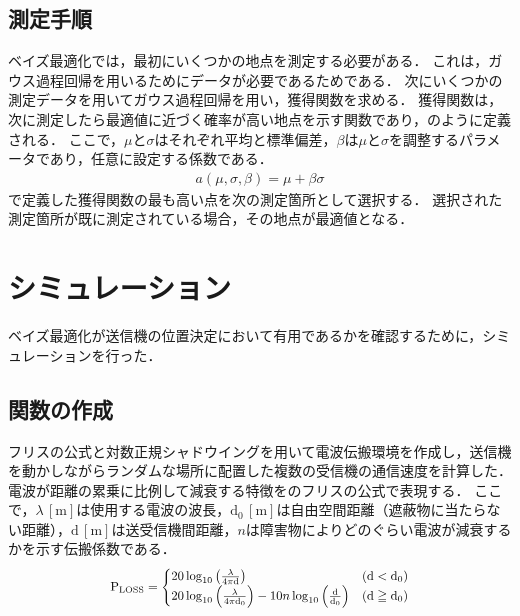 \documentclass[twocolumn]{ltjarticle}
\begin{document}
\subsection{測定手順}

ベイズ最適化では，最初にいくつかの地点を測定する必要がある．
これは，ガウス過程回帰を用いるためにデータが必要であるためである．
次にいくつかの測定データを用いてガウス過程回帰を用い，獲得関数を求める．
獲得関数は，次に測定したら最適値に近づく確率が高い地点を示す関数であり，のように定義される．
ここで，\(\mu\)と\(\sigma\)はそれぞれ平均と標準偏差，\(\beta\)は\(\mu\)と\(\sigma\)を調整するパラメータであり，任意に設定する係数である．
\begin{align}
	a(\mu, \sigma, \beta) = \mu + \beta \sigma \label{eq:acquisition}
\end{align}
で定義した獲得関数の最も高い点を次の測定箇所として選択する．
選択された測定箇所が既に測定されている場合，その地点が最適値となる．
\section{シミュレーション}

ベイズ最適化が送信機の位置決定において有用であるかを確認するために，シミュレーションを行った．
\subsection{関数の作成}

フリスの公式と対数正規シャドウイングを用いて電波伝搬環境を作成し，送信機を動かしながらランダムな場所に配置した複数の受信機の通信速度を計算した．
電波が距離の累乗に比例して減衰する特徴をのフリスの公式で表現する．
ここで，\(\lambda\,\mathrm{[m]}\)は使用する電波の波長，\(\mathrm{d_0}\,\mathrm{[m]}\)は自由空間距離（遮蔽物に当たらない距離），\(\mathrm{d}\,\mathrm{[m]}\)は送受信機間距離，\(n\)は障害物によりどのぐらい電波が減衰するかを示す伝搬係数である．
\begin{align}
	\scalebox{0.9}{
		\(
		\mathrm{P_{LOSS}} =
		\begin{cases}
			20 \log_{10} \left( \frac{\lambda}{4 \pi \mathrm{d}} \right)                                                         & (\mathrm{d < d_0})     \\
			20 \log_{10} \left( \frac{\lambda}{4 \pi \mathrm{d_0}} \right) - 10n \log_{10} \left( \mathrm{\frac{d}{d_0}} \right) & (\mathrm{d \geqq d_0})
		\end{cases} \label{eq:friss}
		\)
	}
\end{align}
\end{document}
